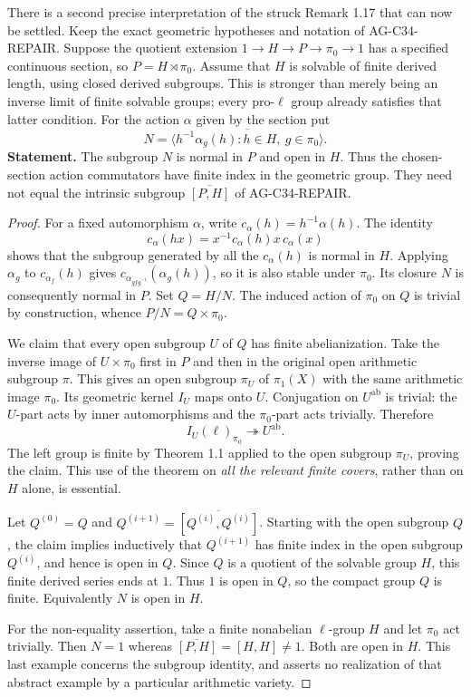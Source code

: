 \documentclass[11pt,a4paper]{article}
\begin{document}
There is a second precise interpretation of the struck Remark 1.17 that
can now be settled. Keep the exact geometric hypotheses and notation of
AG-C34-REPAIR. Suppose the quotient extension
$1\to H\to P\to\pi_0\to1$ has a specified continuous section, so
$P=H\rtimes\pi_0$. Assume that $H$ is solvable of finite derived
length, using closed derived subgroups. This is stronger than merely
being an inverse limit of finite solvable groups; every pro-$\ell$
group already satisfies that latter condition. For the action $\alpha$
given by the section put
\[
 N=\overline{\langle h^{-1}\alpha_g(h):h\in H,
                                      \ g\in\pi_0\rangle}.
\]
\textbf{Statement.} The subgroup $N$ is normal in $P$ and open in
$H$. Thus the chosen-section action commutators have finite index in
the geometric group. They need not equal the intrinsic subgroup
$\overline{[P,H]}$ of AG-C34-REPAIR.

\begin{proof}
For a fixed automorphism $\alpha$, write
$c_\alpha(h)=h^{-1}\alpha(h)$. The identity
\[
 c_\alpha(hx)=x^{-1}c_\alpha(h)x\,c_\alpha(x)
\]
shows that the subgroup generated by all the $c_\alpha(h)$ is normal
in $H$. Applying $\alpha_g$ to $c_{\alpha_f}(h)$ gives
$c_{\alpha_{gfg^{-1}}}(\alpha_g(h))$, so it is also stable under
$\pi_0$. Its closure $N$ is consequently normal in $P$. Set
$Q=H/N$. The induced action of $\pi_0$ on $Q$ is trivial by
construction, whence $P/N=Q\times\pi_0$.

We claim that every open subgroup $U$ of $Q$ has finite abelianization.
Take the inverse image of $U\times\pi_0$ first in $P$ and then in
the original open arithmetic subgroup $\pi$. This gives an open
subgroup $\pi_U$ of $\pi_1(X)$ with the same arithmetic image
$\pi_0$. Its geometric kernel $I_U$ maps onto $U$. Conjugation on
$U^{\mathrm{ab}}$ is trivial: the $U$-part acts by inner
automorphisms and the $\pi_0$-part acts trivially. Therefore
\[
 I_U(\ell)_{\pi_0}\twoheadrightarrow U^{\mathrm{ab}}.
\]
The left group is finite by Theorem 1.1 applied to the open subgroup
$\pi_U$, proving the claim. This use of the theorem on \emph{all
the relevant finite covers}, rather than on $H$ alone, is essential.

Let $Q^{(0)}=Q$ and
$Q^{(i+1)}=\overline{[Q^{(i)},Q^{(i)}]}$. Starting with the open
subgroup $Q$, the claim implies inductively that $Q^{(i+1)}$ has
finite index in the open subgroup $Q^{(i)}$, and hence is open in
$Q$. Since $Q$ is a quotient of the solvable group $H$, this finite
derived series ends at $1$. Thus $1$ is open in $Q$, so the compact
group $Q$ is finite. Equivalently $N$ is open in $H$.

For the non-equality assertion, take a finite nonabelian $\ell$-group
$H$ and let $\pi_0$ act trivially. Then $N=1$ whereas
$\overline{[P,H]}=[H,H]\ne1$. Both are open in $H$. This last
example concerns the subgroup identity, and asserts no realization of
that abstract example by a particular arithmetic variety.
\end{proof}
\end{document}
